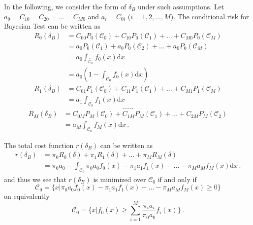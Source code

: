 In the following, we consider the form of $\delta_B$ under such assumptions.
Let $a_0 = C_{10} = C_{20} = ... = C_{M0}$ and $a_i = C_{0i}$ ($i= 1, 2, ..., M$).
The conditional risk for Bayesian Test can be written as 
\begin{equation}
\begin{split}
R_0(\delta_B) &= C_{00}P_0(\mathcal{C}_0) + C_{10}P_0(\mathcal{C}_1) + ... +  C_{M0}P_0(\mathcal{C}_M)\\
&= a_0P_0(\mathcal{C}_1) + a_0P_0(\mathcal{C}_2) + ... + a_0P_0(\mathcal{C}_M)\\
&= a_0 \int_{\bar{\mathcal{C}}_0}f_0(x)\mathrm{d}x\\
&= a_0(1 - \int_{\mathcal{C}_0}f_0(x)\mathrm{d}x)
\end{split}
\end{equation}
\begin{equation}
\begin{split}
R_1(\delta_B) &= C_{01}P_1(\mathcal{C}_0) + C_{11}P_1(\mathcal{C}_1) + ... +  C_{M1}P_1(\mathcal{C}_M)\\  
&= a_1\int_{\mathcal{C}_0}f_1(x)\mathrm{d}x
\end{split}
\end{equation}
\[
......
\]
\begin{equation}
\begin{split}
R_M(\delta_B) &= C_{0M}P_M(\mathcal{C}_0) + C_{1M}P_M(\mathcal{C}_1) + ... +  C_{2M}P_M(\mathcal{C}_2)\\
&= a_M\int_{\mathcal{C}_0}f_{M}(x)\mathrm{d}x\,.
\end{split}
\end{equation}

The total cost function $r(\delta_B)$ can be written as 
\begin{equation}
\begin{split}
\label{r00}
r(\delta_B) &= \pi_0 R_0(\delta) + \pi_1R_1(\delta) + ... +  \pi_MR_M(\delta)\\
&= \pi_0a_0 - \int_{\mathcal{C}_0}\pi_0a_0f_0(x) - \pi_1a_1f_1(x) - ... - \pi_Ma_Mf_M(x) \mathrm{d}x\,. 
\end{split}
\end{equation}
and thus we see that $r(\delta_B)$ is minimized over $\mathcal{C}_0$ if and only if 
\begin{equation}
\label{equ: C}
\mathcal{C}_0 =  \{ x | \pi_0a_0f_0(x) - \pi_1a_1f_1(x) - ... - \pi_Ma_Mf_M(x) \geq 0\}
\end{equation}
on equivalently
\begin{equation}
  \mathcal{C}_0 = \{ x | f_0(x) \geq \sum_{i=1}^{M}\frac{\pi_ia_i}{\pi_0a_0}f_i(x) \}\,.
  \label{2015feb04a1}
\end{equation}

